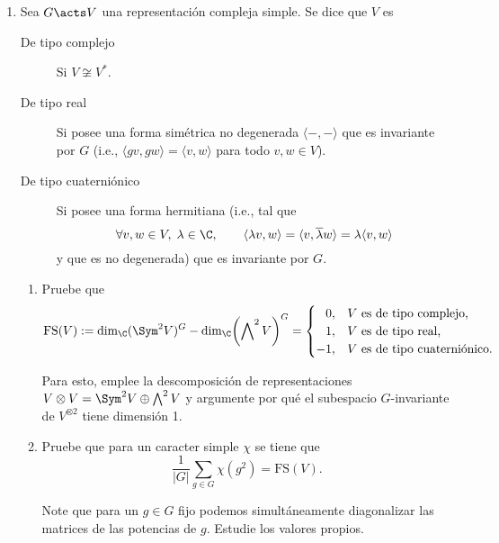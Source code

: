 \documentclass[11pt, reqno]{amsart}
\begin{document}
\begin{enumerate}
		\newex
	\item Sea $G \acts V$ una representación compleja simple.
		Se dice que $V$ es
		\begin{description}
			\item[De tipo complejo] Si $V \not\cong V^*$.
			\item[De tipo real] Si posee una forma simétrica no degenerada $\langle -, - \rangle$ que es invariante por $G$
				(i.e., $\langle gv, gw \rangle = \langle v, w \rangle$ para todo $v, w \in V$).
			\item[De tipo cuaterniónico] Si posee una forma hermitiana (i.e., tal que
				\[
					\forall v, w \in V, \; \lambda \in \C, \qquad
					\langle \lambda v, w \rangle = \langle v, \overline{\lambda} w \rangle = \lambda \langle v, w \rangle
				\]
				y que es no degenerada) que es invariante por $G$.
		\end{description}
		\begin{enumerate}
			\item Pruebe que
				\[
					\mathrm{FS}(V) := \dim_\C (\Sym^2V)^G - \dim_\C\mathopen{}\left( \bigwedge\nolimits^2 V \right)^G =
					\begin{cases}
						\phantom{-}0, & V\text{ es de tipo complejo,} \\
						\phantom{-}1, & V\text{ es de tipo real,} \\
						-1, & V\text{ es de tipo cuaterniónico.} \\
					\end{cases}
				\]
				\begin{hint}
					Para esto, emplee la descomposición de representaciones $V \otimes V = \Sym^2V \oplus \bigwedge^2 V$
					y argumente por qué el subespacio $G$-invariante de $V^{\otimes 2}$ tiene dimensión 1.
				\end{hint}

			\item Pruebe que para un caracter simple $\chi$ se tiene que
				\[
					\frac{1}{|G|} \sum_{g\in G} \chi(g^2) = \mathrm{FS}(V).
				\]
				\begin{hint}
					Note que para un $g \in G$ fijo podemos simultáneamente diagonalizar las matrices de las potencias de $g$.
					Estudie los valores propios.
				\end{hint}


\end{enumerate}
\end{enumerate}
\end{document}
